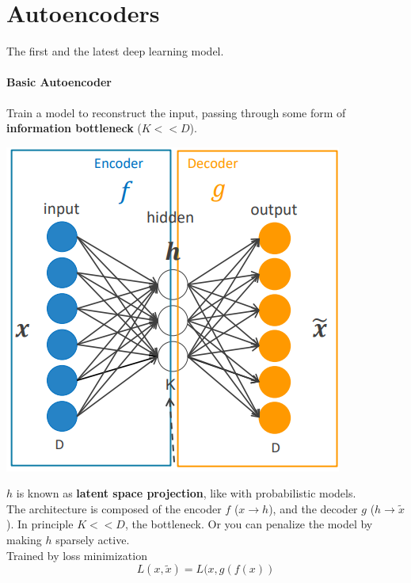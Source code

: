 \documentclass[10pt]{report}
\begin{document}
\section{Autoencoders} The first and the latest deep learning model.
\paragraph{Basic Autoencoder} Train a model to reconstruct the input, passing through some form of \textbf{information bottleneck} ($K<<D$).\begin{center}
	\includegraphics[scale=0.5]{75.png}
\end{center}
$h$ is known as \textbf{latent space projection}, like with probabilistic models.\\
The architecture is composed of the encoder $f$ ($x\rightarrow h$), and the decoder $g$ ($h\rightarrow\tilde{x}$). In principle $K << D$, the bottleneck. Or you can penalize the model by making $h$ sparsely active.\\
Trained by loss minimization
$$L(x,\tilde{x})=L(x,g(f(x))$$
\end{document}
